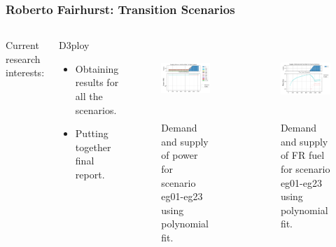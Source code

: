 \begin{frame}
	\frametitle{Roberto Fairhurst: Transition Scenarios}
		\begin{columns}
		\column[t]{6cm}
		Current research interests:
		\begin{block}{D3ploy}
			\begin{itemize}
				\item Obtaining results for all the scenarios.
				\item Putting together final report.
			\end{itemize}
		\end{block}

        \begin{figure}[htbp!]
     	\begin{center}
				\includegraphics[height=3cm]{./images/eg23-power-poly}
			\end{center}
			\caption{Demand and supply of power for scenario eg01-eg23 using polynomial fit.}
			\label{fig:eg23-power}
	    \end{figure}

		\column[t]{4cm}
		\begin{figure}[htbp!]
			\begin{center}
				\includegraphics[height=3cm]{./images/eg23-frfuel}
			\end{center}
			\caption{Demand and supply of FR fuel for scenario eg01-eg23 using polynomial fit.}
			\label{fig:eg23-frfuel}
		\end{figure}
		\end{columns}
\end{frame}